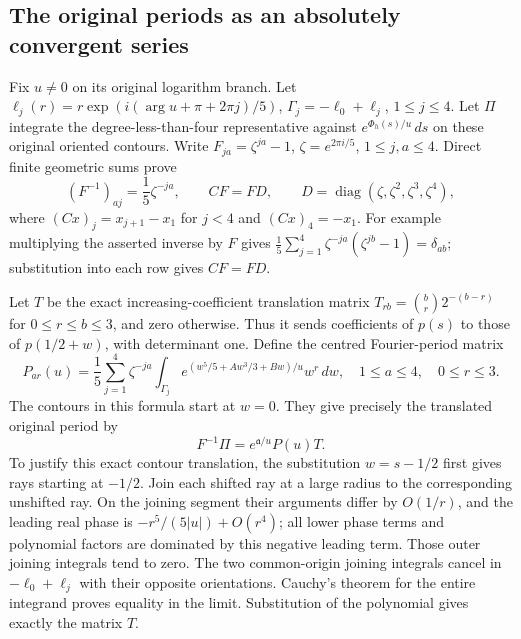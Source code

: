 \documentclass[11pt,a4paper]{article}
\begin{document}
\subsection{The original periods as an absolutely convergent series}
Fix $u\ne0$ on its original logarithm branch. Let
$\ell_j(r)=r\exp(i(\arg u+\pi+2\pi j)/5)$,
$\Gamma_j=-\ell_0+\ell_j$, $1\leq j\leq4$.
Let $\Pi$ integrate the degree-less-than-four representative
against $e^{\Phi_h(s)/u}\,ds$ on these original oriented contours.
Write $F_{ja}=\zeta^{ja}-1$, $\zeta=e^{2\pi i/5}$,
$1\leq j,a\leq4$. Direct finite geometric sums prove
\[
 (F^{-1})_{aj}=\frac15\zeta^{-ja},\qquad
 CF=F D,\qquad D=\operatorname{diag}(\zeta,\zeta^2,\zeta^3,\zeta^4),
 \tag{PQO5}
\]
where $(Cx)_j=x_{j+1}-x_1$ for $j<4$ and $(Cx)_4=-x_1$.
For example multiplying the asserted inverse by $F$ gives
$\frac15\sum_{j=1}^4\zeta^{-ja}(\zeta^{jb}-1)=\delta_{ab}$;
substitution into each row gives $CF=FD$.

Let $T$ be the exact increasing-coefficient translation matrix
$T_{rb}=\binom br2^{-(b-r)}$ for $0\leq r\leq b\leq3$, and
zero otherwise. Thus it sends coefficients of $p(s)$ to those
of $p(1/2+w)$, with determinant one. Define the centred
Fourier-period matrix
\[
 P_{ar}(u)=\frac15\sum_{j=1}^4\zeta^{-ja}
 \int_{\Gamma_j}e^{(w^5/5+Aw^3/3+Bw)/u}w^r\,dw,
 \quad 1\leq a\leq4,\quad0\leq r\leq3.
 \tag{PQO6}
\]
The contours in this formula start at $w=0$. They give precisely
the translated original period by
\[
 F^{-1}\Pi=e^{\mathfrak a/u}P(u)T.
 \tag{PQO7}
\]
To justify this exact contour translation, the substitution
$w=s-1/2$ first gives rays starting at $-1/2$. Join each shifted
ray at a large radius to the corresponding unshifted ray. On the
joining segment their arguments differ by $O(1/r)$, and the
leading real phase is $-r^5/(5|u|)+O(r^4)$; all lower phase
terms and polynomial factors are dominated by this negative
leading term. Those outer joining integrals tend to zero.
The two common-origin joining integrals cancel in
$-\ell_0+\ell_j$ with their opposite orientations. Cauchy's
theorem for the entire integrand proves equality in the limit.
Substitution of the polynomial gives exactly the matrix $T$.
\end{document}
